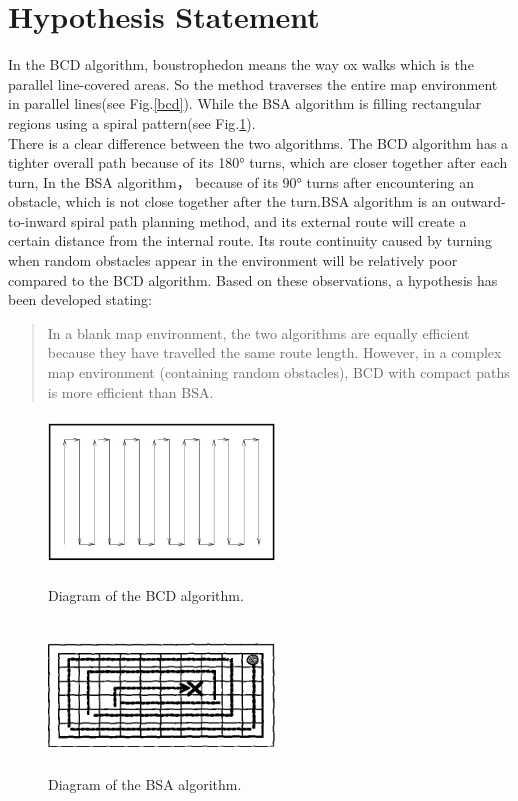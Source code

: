 \documentclass[conference]{IEEEtran}
\begin{document}
\section{Hypothesis Statement}
In the BCD algorithm, boustrophedon\cite{choset1998coverage} means the way ox walks which is the parallel line-covered areas. So the method traverses the entire map environment in parallel lines(see Fig.\ref{bcd}). While the BSA algorithm\cite{Gonzlez2003BSAAC} is filling rectangular regions using a spiral pattern(see Fig.\ref{bsa}).\\
There is a clear difference between the two algorithms. The BCD algorithm has a tighter overall path because of its 180° turns, which are closer together after each turn, In the BSA algorithm，  because of its 90° turns after encountering an obstacle, which is not close together after the turn.BSA algorithm is an outward-to-inward spiral path planning method, and its external route will create a certain distance from the internal route. Its route continuity caused by turning when random obstacles appear in the environment will be relatively poor compared to the BCD algorithm.
Based on these observations, a hypothesis has been developed stating:
\begin{quote}
     In a blank map environment, the two algorithms are equally efficient because they have travelled the same route length. However, in a complex map environment (containing random obstacles), BCD with compact paths is more efficient than BSA.
\end{quote}

\begin{figure}[htbp]
\centering
\begin{minipage}[t]{0.48\textwidth}
\centering
\includegraphics[width=6cm,height=4cm]{RS_Report/bcd.png}
\caption{Diagram of the BCD algorithm\cite{choset1998coverage}. }
\label{bcd}
\end{minipage}
\begin{minipage}[t]{0.48\textwidth}
\centering
\includegraphics[width=6cm,height=4cm]{RS_Report/BSA.png}
\caption{Diagram of the BSA algorithm\cite{Gonzlez2003BSAAC}.}
\label{bsa}
\end{minipage}
\end{figure}
\end{document}
